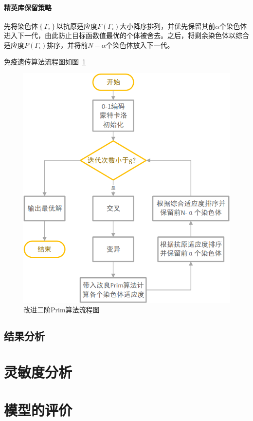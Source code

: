 \documentclass{whutmod}
\begin{document}
  	\paragraph{精英库保留策略}
  	先将染色体$\left \{ \Gamma_i \right \}$以抗原适应度$F(\Gamma_i)$大小降序排列，并优先保留其前$\alpha$个染色体进入下一代，由此防止目标函数值最优的个体被舍去。之后，将剩余染色体以综合适应度$P(\Gamma_i)$排序，并将前$N-\alpha$个染色体放入下一代。
  	
  	免疫遗传算法流程图如图~\ref{bgrs}~
  	  \begin{figure}[H]
  		\centering
  		\includegraphics[width=\textwidth]{figures/a31.png}
  		\caption{改进二阶Prim算法流程图}\label{bgrs}
  	\end{figure}
  	
  		\subsection{结果分析}
  	
  	\section{灵敏度分析}
 
  	\section{模型的评价}
\end{document}
